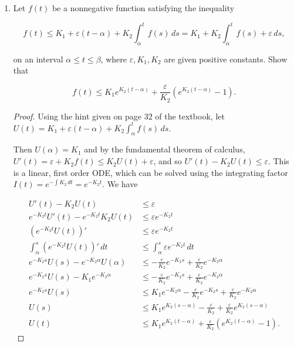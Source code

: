 \documentclass[11pt,oneside,english]{amsart}
\theoremstyle{definition}
\begin{document}
\rightline{\today}



\vspace{1cm}
\begin{enumerate}

\vspace{-1cm}
\item Let $f(t)$ be a nonnegative function satisfying the inequality

\[
f(t)\leq K_1+\varepsilon(t-\alpha)+K_2\int_\alpha^tf(s)\,ds=K_1+K_2\int_\alpha^tf(s)+\varepsilon\,ds,
\]

on an interval $\alpha\leq t\leq \beta$, where $\varepsilon,K_1,K_2$ are given positive constants. Show that

\[
f(t)\leq K_1e^{K_2(t-\alpha)}+\frac{\varepsilon}{K_2}\left(e^{K_2(t-\alpha)}-1\right).
\]

\begin{proof}
Using the hint given on page 32 of the textbook, let $\displaystyle U(t)=K_1+\varepsilon(t-\alpha)+K_2\int_\alpha^tf(s)\,ds$. 

Then $U(\alpha)=K_1$ and by the fundamental theorem of calculus, $U'(t)=\varepsilon+K_2f(t)\leq K_2U(t)+\varepsilon$, and so $U'(t)-K_2U(t)\leq\varepsilon$. This is a linear, first order ODE, which can be solved using the integrating factor $I(t)=e^{-\int K_2\,dt}=e^{-K_2t}$. We have

\begin{align*}
U'(t)-K_2U(t)&\leq\varepsilon\\[2mm]
e^{-K_2t}U'(t)-e^{-K_2t}K_2U(t)&\leq\varepsilon e^{-K_2t}\\[2mm]
\left(e^{-K_2t}U(t)\right)'&\leq\varepsilon e^{-K_2t}\\[2mm]
\int_\alpha^s\left(e^{-K_2t}U(t)\right)'\,dt&\leq\int_\alpha^s\varepsilon e^{-K_2t}\,dt\\[2mm]
e^{-K_2s}U(s)-e^{-K_2\alpha}U(\alpha)&\leq-\frac{\varepsilon}{K_2}e^{-K_2s}+\frac{\varepsilon}{K_2}e^{-K_2\alpha}\\[2mm]
e^{-K_2s}U(s)-K_1e^{-K_2\alpha}&\leq-\frac{\varepsilon}{K_2}e^{-K_2s}+\frac{\varepsilon}{K_2}e^{-K_2\alpha}\\[2mm]
e^{-K_2s}U(s)&\leq K_1e^{-K_2\alpha}-\frac{\varepsilon}{K_2}e^{-K_2s}+\frac{\varepsilon}{K_2}e^{-K_2\alpha}\\[2mm]
U(s)&\leq K_1e^{K_2(s-\alpha)}-\frac{\varepsilon}{K_2}+\frac{\varepsilon}{K_2}e^{K_2(s-\alpha)}\\[2mm]
U(t)&\leq K_1e^{K_2(t-\alpha)}+\frac{\varepsilon}{K_2}\left(e^{K_2(t-\alpha)}-1\right).
\end{align*}


\end{proof}
\end{enumerate}
\end{document}
